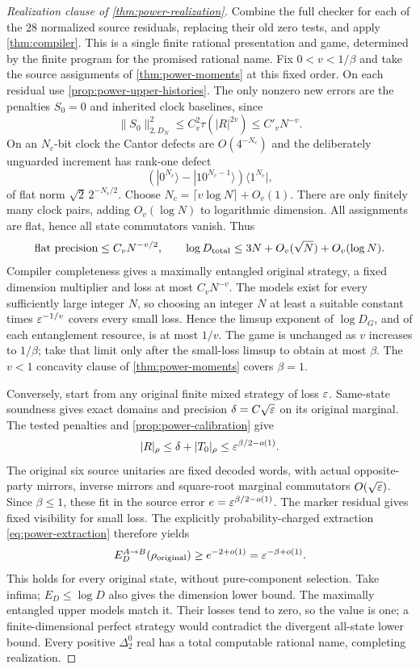 \begin{proof}[Realization clause of \cref{thm:power-realization}]
Combine the full checker for each of the $28$ normalized source residuals, replacing their old zero tests, and apply \cref{thm:compiler}. This is a single finite rational presentation and game, determined by the finite program for the promised rational name.
Fix $0<v<1/\beta$ and take the source assignments of \cref{thm:power-moments} at this fixed order. On each residual use \cref{prop:power-upper-histories}. The only nonzero new errors are the penalties $S_0=0$ and inherited clock baselines, since
\[
 \|S_0\|_{2,D_N}^2\le C_v^2\tau(|R|^{2v})\le C'_vN^{-v}.
\]
On an $N_c$-bit clock the Cantor defects are $O(4^{-N_c})$ and the deliberately unguarded increment has rank-one defect
\[
 (|0^{N_c}\rangle-|10^{N_c-1}\rangle)\langle1^{N_c}|,
\]
of flat norm $\sqrt2\,2^{-N_c/2}$. Choose $N_c=\lceil v\log N\rceil+O_v(1)$. There are only finitely many clock pairs, adding $O_v(\log N)$ to logarithmic dimension. All assignments are flat, hence all state commutators vanish. Thus
\[
 \text{flat precision}\le C_vN^{-v/2},\qquad
 \log D_{\rm total}\le3N+O_v(\sqrt N)+O_v(\log N).
\]
Compiler completeness gives a maximally entangled original strategy, a fixed dimension multiplier and loss at most $C_vN^{-v}$. The models exist for every sufficiently large integer $N$, so choosing an integer $N$ at least a suitable constant times $\varepsilon^{-1/v}$ covers every small loss. Hence the limsup exponent of $\log D_G$, and of each entanglement resource, is at most $1/v$. The game is unchanged as $v$ increases to $1/\beta$; take that limit only after the small-loss limsup to obtain at most $\beta$. The $v<1$ concavity clause of \cref{thm:power-moments} covers $\beta=1$.

Conversely, start from any original finite mixed strategy of loss $\varepsilon$. Same-state soundness gives exact domains and precision $\delta=C\sqrt{\varepsilon}$ on its original marginal. The tested penalties and \cref{prop:power-calibration} give
\[
 |R|_\rho\le\delta+|T_0|_\rho\le\varepsilon^{\beta/2-o(1)}.
\]
The original six source unitaries are fixed decoded words, with actual opposite-party mirrors, inverse mirrors and square-root marginal commutators $O(\sqrt{\varepsilon})$. Since $\beta\le1$, these fit in the source error $e=\varepsilon^{\beta/2-o(1)}$. The marker residual gives fixed visibility for small loss. The explicitly probability-charged extraction \eqref{eq:power-extraction} therefore yields
\[
 E_D^{A\to B}(\rho_{\rm original})\ge e^{-2+o(1)}=\varepsilon^{-\beta+o(1)}.
\]
This holds for every original state, without pure-component selection. Take infima; $E_D\le\log D$ also gives the dimension lower bound. The maximally entangled upper models match it. Their losses tend to zero, so the value is one; a finite-dimensional perfect strategy would contradict the divergent all-state lower bound. Every positive $\Delta^0_2$ real has a total computable rational name, completing realization.
\end{proof}
